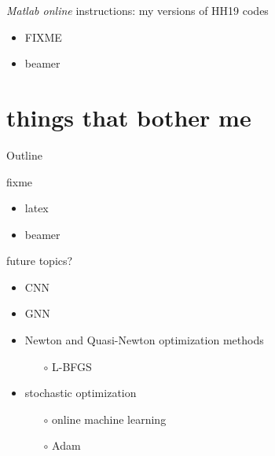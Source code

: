 \documentclass[xcolor={svgnames},
               hyperref={colorlinks,citecolor=DeepPink4,linkcolor=FireBrick,urlcolor=Maroon}]
               {beamer}
\begin{document}
\begin{frame}{\emph{Matlab online} instructions: my versions of HH19 codes}

\begin{itemize}
\item FIXME
\item beamer
\end{itemize}
\end{frame}


\section{things that bother me}

\begin{frame}{Outline}
\end{frame}


\begin{frame}{fixme}

\begin{itemize}
\item latex
\item beamer
\end{itemize}
\end{frame}


\begin{frame}{future topics?}

\begin{itemize}
\item CNN
\item GNN
\item Newton and Quasi-Newton optimization methods
    \begin{itemize}
    \item[$\circ$] L-BFGS
    \end{itemize}
\item stochastic optimization
    \begin{itemize}
    \item[$\circ$] online machine learning
    \item[$\circ$] Adam
    \end{itemize}
\end{itemize}
\end{frame}
\end{document}
